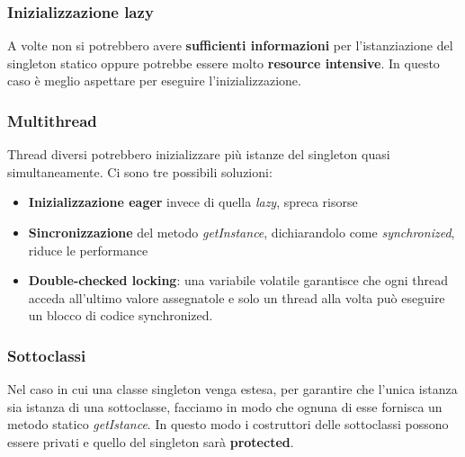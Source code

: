 \subsubsection{Inizializzazione lazy} A volte non si potrebbero avere \textbf{sufficienti informazioni} per l'istanziazione del singleton statico oppure potrebbe essere molto \textbf{resource intensive}. In questo caso è meglio aspettare per eseguire l'inizializzazione.

\subsubsection{Multithread} Thread diversi potrebbero inizializzare più istanze del singleton quasi simultaneamente. Ci sono tre possibili soluzioni:
\begin{itemize}
	\item \textbf{Inizializzazione eager} invece di quella \textit{lazy}, spreca risorse
	\item \textbf{Sincronizzazione} del metodo \textit{getInstance}, dichiarandolo come \textit{synchronized}, riduce le performance
	\item \textbf{Double-checked locking}: una variabile volatile garantisce che ogni thread acceda all'ultimo valore assegnatole e solo un thread alla volta può eseguire un blocco di codice synchronized.
\end{itemize}

\subsubsection{Sottoclassi}
Nel caso in cui una classe singleton venga estesa, per garantire che l'unica istanza sia istanza di una sottoclasse, facciamo in modo che ognuna di esse fornisca un metodo statico \textit{getIstance}. In questo modo i costruttori delle sottoclassi possono essere privati e quello del singleton sarà \textbf{protected}.